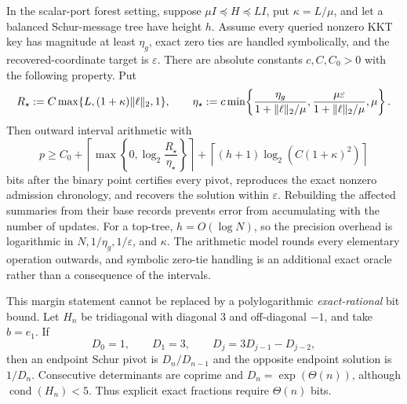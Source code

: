 \begin{proposition}
\label{prop:aesp-cd-dynamic-schur-precision}
In the scalar-port forest setting, suppose $\mu I\preceq H\preceq LI$, put
$\kappa=L/\mu$, and let a balanced Schur-message tree have height $h$.
Assume every queried nonzero KKT key has magnitude at least $\eta_g$, exact
zero ties are handled symbolically, and the recovered-coordinate target is
$\varepsilon$.  There are absolute constants $c,C,C_0>0$ with the following
property.  Put
\begin{equation*}
 R_\star:=C\max\{L,(1+\kappa)\lVert\ell\rVert_2,1\},\qquad
 \eta_\star:=c\min\!\left\{
 \frac{\eta_g}{1+\lVert\ell\rVert_2/\mu},
 \frac{\mu\varepsilon}{1+\lVert\ell\rVert_2/\mu},\mu
 \right\}.
\end{equation*}
Then outward interval arithmetic with
\begin{equation}
 p\geq C_0+
 \left\lceil\max\!\left\{0,\log_2\frac{R_\star}{\eta_\star}
 \right\}\right\rceil
 +
 \left\lceil (h+1)\log_2(C(1+\kappa)^2)\right\rceil
 \label{eq:aesp-cd-dynamic-schur-precision}
\end{equation}
bits after the binary point certifies every pivot, reproduces the exact
nonzero admission chronology, and recovers the solution within
$\varepsilon$.  Rebuilding the affected summaries from their base records
prevents error from accumulating with the number of updates.  For a
top-tree, $h=O(\log N)$, so the precision overhead is logarithmic in
$N,1/\eta_g,1/\varepsilon$, and $\kappa$.
The arithmetic model rounds every elementary operation outwards, and
symbolic zero-tie handling is an additional exact oracle rather than a
consequence of the intervals.

This margin statement cannot be replaced by a polylogarithmic
\emph{exact-rational} bit bound.  Let $H_n$ be tridiagonal with diagonal $3$
and off-diagonal $-1$, and take $b=e_1$.  If
\begin{equation*}
 D_0=1,\qquad D_1=3,\qquad D_j=3D_{j-1}-D_{j-2},
\end{equation*}
then an endpoint Schur pivot is $D_n/D_{n-1}$ and the opposite endpoint
solution is $1/D_n$.  Consecutive determinants are coprime and
$D_n=\exp(\Theta(n))$, although $\operatorname{cond}(H_n)<5$.
Thus explicit exact fractions require $\Theta(n)$ bits.
\end{proposition}

